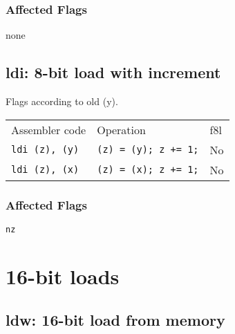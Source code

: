 \documentclass{book}
\begin{document}
\subsubsection*{Affected Flags}

none


\subsection{ldi: 8-bit load with increment}

Flags according to old (y).

\begin{tabular}{l l l}
Assembler code        & Operation                   & f8l \\
\texttt{ldi (z), (y)} & \texttt{(z) = (y); z += 1;} & No \\
\texttt{ldi (z), (x)} & \texttt{(z) = (x); z += 1;} & No \\
\end{tabular}

\subsubsection*{Affected Flags}

\texttt{nz}


\section{16-bit loads}

\subsection{ldw: 16-bit load from memory}
\end{document}
